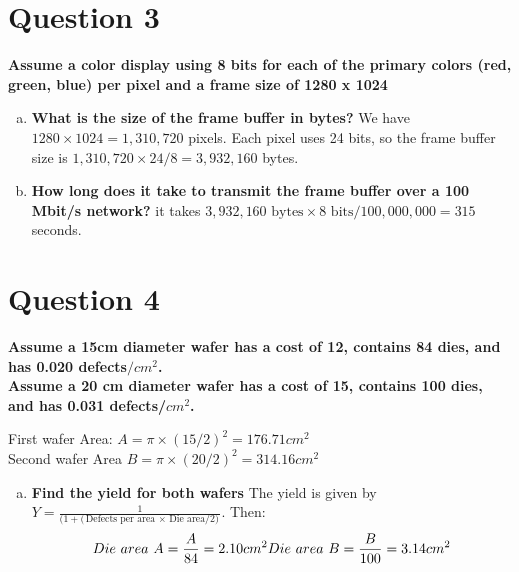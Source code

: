 \documentclass[12pt]{article}
\begin{document}
\section*{Question 3}
\textbf{Assume a color display using 8 bits for each of the primary colors (red, green, blue) per pixel
and a frame size of 1280 x 1024}
\begin{enumerate}[a)]
    \item \textbf{What is the size of the frame buffer in bytes?} We have $1280 \times 1024 = 1,310,720$ pixels. Each pixel uses 24 bits, so the frame buffer size is $1,310,720 \times 24 / 8 = 3,932,160$ bytes.
    \item \textbf{How long does it take to transmit the frame buffer over a 100 Mbit/s network?} it takes $3,932,160\text{ bytes} \times 8\text{ bits} / 100,000,000 = 315$ seconds.
\end{enumerate}

\section*{Question 4}
\textbf{Assume a 15cm diameter wafer has a cost of 12, contains 84 dies, and has 0.020 defects$/cm^2$. \\ Assume a 20 cm diameter wafer has a cost of 15, contains 100 dies, and has 0.031 defects/$cm^2$.}

First wafer Area: $A = \pi \times (15/2)^2 = 176.71 cm^2$ \\
Second wafer Area $B =\pi \times (20/2)^2 = 314.16 cm^2$

\begin{enumerate}[a)]
    \item \textbf{Find the yield for both wafers} The yield is given by $Y = \frac{1}{(1 + (\text{Defects per area $\times$ Die area/2)}}$. Then:
        \begin{equation*}
            Die\ area\ A = \frac{A}{84} = 2.10 cm^2 \\ 
            Die\ area\ B = \frac{B}{100} = 3.14 cm^2
        \end{equation*}
\end{enumerate}
\end{document}
